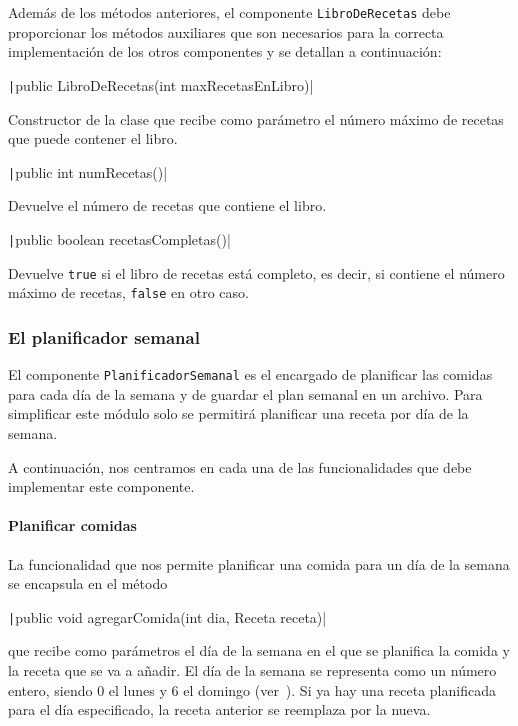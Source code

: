 \documentclass[
    a4paper, %
    12pt, %
]{CSSullivanBusinessReport}
\begin{document}
Además de los métodos anteriores, el componente \texttt{LibroDeRecetas} debe proporcionar los métodos auxiliares que son necesarios para la correcta implementación de los otros componentes y se detallan a continuación:

\texttt|public LibroDeRecetas(int maxRecetasEnLibro)|

Constructor de la clase que recibe como parámetro el número máximo de recetas que puede contener el libro.

\texttt|public int numRecetas()|

Devuelve el número de recetas que contiene el libro.

\texttt|public boolean recetasCompletas()|

Devuelve \texttt{true} si el libro de recetas está completo, es decir, si contiene el número máximo de recetas, \texttt{false} en otro caso.




\subsubsection{El planificador semanal}\label{sec:planificador-semanal}

El componente \texttt{PlanificadorSemanal} es el encargado de planificar las comidas para cada día de la semana y de guardar el plan semanal en un archivo. Para simplificar este módulo solo se permitirá planificar una receta por día de la semana.

A continuación, nos centramos en cada una de las funcionalidades que debe implementar este componente.

\paragraph{Planificar comidas}

La funcionalidad que nos permite planificar una comida para un día de la semana se encapsula en el método

\texttt|public void agregarComida(int dia, Receta receta)|

que recibe como parámetros el día de la semana en el que se planifica la comida y la receta que se va a añadir. El día de la semana se representa como un número entero, siendo 0 el lunes y 6 el domingo (ver~). Si ya hay una receta planificada para el día especificado, la receta anterior se reemplaza por la nueva.
\end{document}
